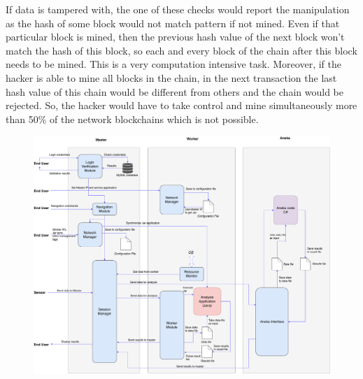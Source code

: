 \documentclass[10pt,journal,compsoc]{IEEEtran}
\begin{document}
If data is tampered with, the one of these checks would report the manipulation as the hash of some block would not match pattern if not mined. Even if that particular block is mined, then the previous hash value of the next block won’t match the hash of this block, so each and every block of the chain after this block needs to be mined. This is a very computation intensive task. Moreover, if the hacker is able to mine all blocks in the chain, in the next transaction the last hash value of this chain would be different from others and the chain would be rejected. So, the hacker would have to take control and mine simultaneously more than 50\% of the network blockchains which is not possible.

\begin{figure}[h]
\centering
\includegraphics[width=16cm]{working}
\end{figure}
\end{document}
